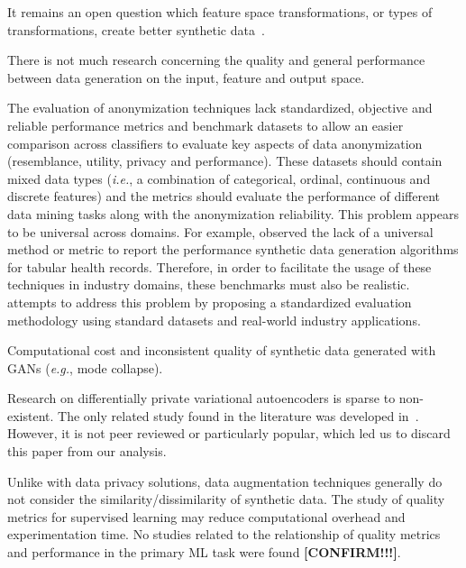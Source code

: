 \documentclass[parskip=full]{scrartcl}
\begin{document}
It remains an open question which feature space transformations, or types of
transformations, create better synthetic data~\cite{cheung2020modals}.


There is not much research concerning the quality and general performance
between data generation on the input, feature and output space.

The evaluation of anonymization techniques lack standardized, objective and
reliable performance metrics and benchmark datasets to allow an easier
comparison across classifiers to evaluate key aspects of data anonymization
(resemblance, utility, privacy and performance). These datasets should contain
mixed data types (\textit{i.e.}, a combination of categorical, ordinal,
continuous and discrete features) and the metrics should evaluate the
performance of different data mining tasks along with the anonymization
reliability. This problem appears to be universal across domains. For example,
\citet{hernandez2022synthetic} observed the lack of a universal method or
metric to report the performance synthetic data generation algorithms for
tabular health records. Therefore, in order to facilitate the usage of these
techniques in industry domains, these benchmarks must also be
realistic. \citet{rosenblatt2020differentially} attempts to address this
problem by proposing a standardized evaluation methodology using standard
datasets and real-world industry applications.

Computational cost and inconsistent quality of synthetic data generated with
GANs (\textit{e.g.}, mode collapse).

Research on differentially private variational autoencoders is sparse to
non-existent. The only related study found in the literature was developed
in~\cite{takahashi2020differentially}. However, it is not peer reviewed or
particularly popular, which led us to discard this paper from our analysis.

Unlike with data privacy solutions, data augmentation techniques generally do
not consider the similarity/dissimilarity of synthetic data. The study of
quality metrics for supervised learning may reduce computational overhead and
experimentation time. No studies related to the relationship of quality
metrics and performance in the primary ML task were found
\textbf{[CONFIRM!!!]}.
\end{document}
